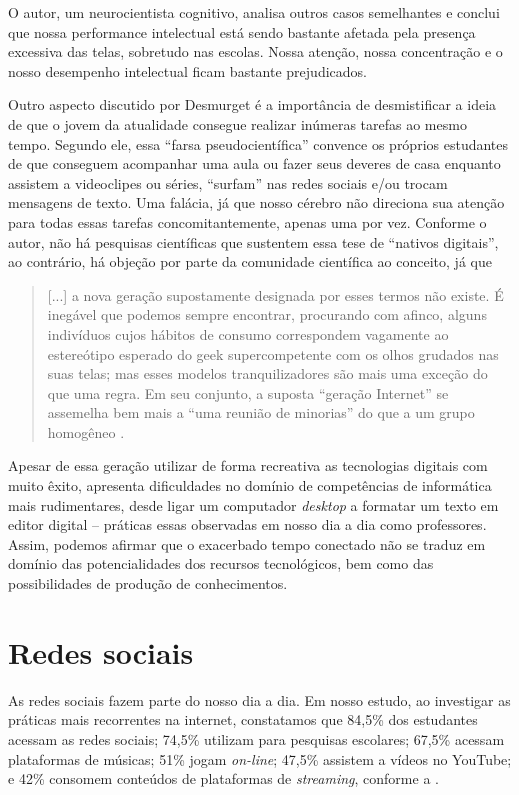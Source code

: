 \documentclass[portuguese]{textolivre}
\begin{document}
O autor, um neurocientista cognitivo, analisa outros casos semelhantes e conclui que nossa performance intelectual está sendo bastante afetada pela presença excessiva das telas, sobretudo nas escolas. Nossa atenção, nossa concentração e o nosso desempenho intelectual ficam bastante prejudicados.

Outro aspecto discutido por Desmurget é a importância de desmistificar a ideia de que o jovem da atualidade consegue realizar inúmeras tarefas ao mesmo tempo. Segundo ele, essa ``farsa pseudocientífica'' \cite[p.~123]{desmurget_fabrica_2023} convence os próprios estudantes de que conseguem acompanhar uma aula ou fazer seus deveres de casa enquanto assistem a videoclipes ou séries, ``surfam'' nas redes sociais e/ou trocam mensagens de texto. Uma falácia, já que nosso cérebro não direciona sua atenção para todas essas tarefas concomitantemente, apenas uma por vez. Conforme o autor, não há pesquisas científicas que sustentem essa tese de ``nativos digitais'', ao contrário, há objeção por parte da comunidade científica ao conceito, já que

\begin{quote}
    [...] a nova geração supostamente designada por esses termos não existe. É inegável que podemos sempre encontrar, procurando com afinco, alguns indivíduos cujos hábitos de consumo correspondem vagamente ao estereótipo esperado do geek supercompetente com os olhos grudados nas suas telas; mas esses modelos tranquilizadores são mais uma exceção do que uma regra. Em seu conjunto, a suposta ``geração Internet'' se assemelha bem mais a ``uma reunião de minorias'' do que a um grupo homogêneo \cite[p.~21]{desmurget_fabrica_2023}.
\end{quote}

Apesar de essa geração utilizar de forma recreativa as tecnologias digitais com muito êxito, apresenta dificuldades no domínio de competências de informática mais rudimentares, desde ligar um computador \textit{desktop} a formatar um texto em editor digital – práticas essas observadas em nosso dia a dia como professores. Assim, podemos afirmar que o exacerbado tempo conectado não se traduz em domínio das potencialidades dos recursos tecnológicos, bem como das possibilidades de produção de conhecimentos.

\section{Redes sociais}\label{sec-formato}
As redes sociais fazem parte do nosso dia a dia. Em nosso estudo, ao investigar as práticas mais recorrentes na internet, constatamos que 84,5\% dos estudantes acessam as redes sociais; 74,5\% utilizam para pesquisas escolares; 67,5\% acessam plataformas de músicas; 51\% jogam \textit{on-line}; 47,5\% assistem a vídeos no YouTube; e 42\% consomem conteúdos de plataformas de \textit{streaming}, conforme a .
\end{document}
